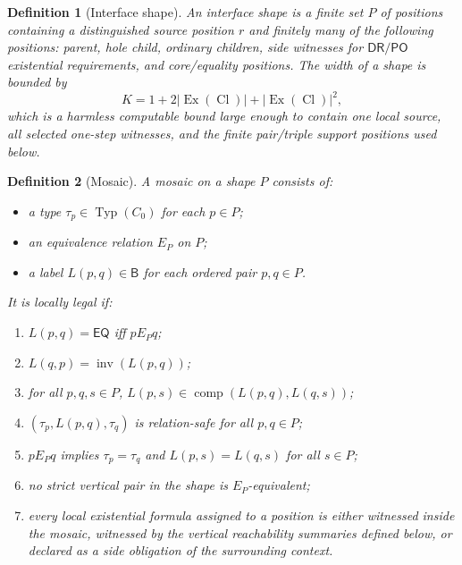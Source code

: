 \documentclass[11pt]{article}
\newtheorem{definition}{Definition}[section]
\theoremstyle{remark}
\newcommand{\Base}{\mathsf{B}}
\newcommand{\DR}{\mathsf{DR}}
\newcommand{\PO}{\mathsf{PO}}
\newcommand{\EQ}{\mathsf{EQ}}
\newcommand{\Inv}{\operatorname{inv}}
\newcommand{\comp}{\operatorname{comp}}
\newcommand{\Cl}{\operatorname{Cl}}
\newcommand{\Typ}{\operatorname{Typ}}
\newcommand{\Ex}{\operatorname{Ex}}
\begin{document}
\begin{definition}[Interface shape]
An interface shape is a finite set $P$ of positions containing a distinguished source position $r$ and finitely many of the following positions: parent, hole child, ordinary children, side witnesses for $\DR/\PO$ existential requirements, and core/equality positions.  The width of a shape is bounded by
\[
K=1+2|\Ex(\Cl)|+|\Ex(\Cl)|^2,
\]
which is a harmless computable bound large enough to contain one local source, all selected one-step witnesses, and the finite pair/triple support positions used below.
\end{definition}

\begin{definition}[Mosaic]
A mosaic on a shape $P$ consists of:
\begin{itemize}
\item a type $\tau_p\in\Typ(C_0)$ for each $p\in P$;
\item an equivalence relation $E_P$ on $P$;
\item a label $L(p,q)\in\Base$ for each ordered pair $p,q\in P$.
\end{itemize}
It is locally legal if:
\begin{enumerate}[label=(M\arabic*)]
\item $L(p,q)=\EQ$ iff $pE_P q$;
\item $L(q,p)=\Inv(L(p,q))$;
\item for all $p,q,s\in P$, $L(p,s)\in\comp(L(p,q),L(q,s))$;
\item $(\tau_p,L(p,q),\tau_q)$ is relation-safe for all $p,q\in P$;
\item $pE_P q$ implies $\tau_p=\tau_q$ and $L(p,s)=L(q,s)$ for all $s\in P$;
\item no strict vertical pair in the shape is $E_P$-equivalent;
\item every local existential formula assigned to a position is either witnessed inside the mosaic, witnessed by the vertical reachability summaries defined below, or declared as a side obligation of the surrounding context.
\end{enumerate}
\end{definition}
\end{document}
